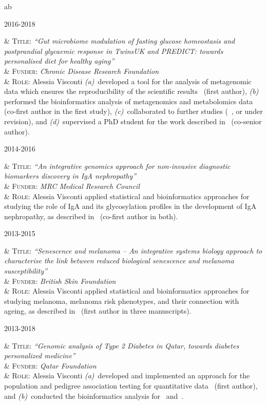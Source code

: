 \documentclass[a4paper,10pt]{article}
\newenvironment{singletablelist}
{	\vspace{-0.2cm}
	\begin{longtable}[!h]{ab}}{\end{longtable}
}
\newcommand{\stlist}[2]{
	\hspace{-3cm}
	\noindent
	\begin{minipage}{0.24\textwidth}
	\begin{flushright}
	\textsc{#1}
	\end{flushright}
	\end{minipage}
	& #2\\[0.2cm]
}
\begin{document}
\begin{singletablelist}
	
	\stlist{2016-2018}{ 
		\textsc{Title:} \emph{``Gut microbiome modulation of fasting glucose homeostasis and postprandial glycaemic response in TwinsUK and PREDICT: towards personalised diet for healthy aging''}\\
		& \textsc{Funder:} \emph{Chronic Disease Research Foundation}\\
		& \textsc{Role:} Alessia Visconti \emph{(a)}~developed a tool for the analysis of metagenomic data which ensures the reproducibility of the scientific results~\cite{Vis18b} (first author), \emph{(b)} performed the bioinformatics analysis of metagenomics and metabolomics data~\cite{Vis19,Bar20} (co-first author in the first study), \emph{(c)}~collaborated to further studies (~\cite{Lou23,Nog23a,Nog23b}, or under revision), and \emph{(d)}~supervised a PhD student for the work described in~\cite{Zha22} (co-senior author).
}

	\stlist{2014-2016}{  
		\textsc{Title:} \emph{``An integrative genomics approach for non-invasive diagnostic biomarkers discovery in IgA nephropathy''}\\
		& \textsc{Funder:} \emph{MRC Medical Research Council}\\
		& \textsc{Role:} Alessia Visconti applied statistical and bioinformatics approaches for studying the role of IgA and its glycosylation profiles in the development of IgA nephropathy, as described in~\cite{Lom16,Dot21} (co-first author in both).}
	
	\stlist{2013-2015}{ 
		\textsc{Title:} \emph{``Senescence and melanoma -- An integrative systems biology approach to characterise the link between reduced biological senescence and melanoma susceptibility''}\\
		& \textsc{Funder:} \emph{British Skin Foundation}\\
		& \textsc{Role:} Alessia Visconti applied statistical and bioinformatics approaches for studying melanoma, melanoma risk phenotypes, and their connection with ageing, as described in~\cite{Rib16,Hys18,Vis18a,Duf17,Vis19a,Vis20,San20} (first author in three manuscripts).}
				
	\stlist{2013-2018}{ 
		\textsc{Title:} \emph{``Genomic analysis of Type 2 Diabetes in Qatar, towards diabetes personalized medicine''}\\
		& \textsc{Funder:} \emph{Qatar Foundation}\\
		& \textsc{Role:} Alessia Visconti \emph{(a)}~developed and implemented an approach for the population and pedigree association testing for quantitative data~\cite{Vis16} (first author), and \emph{(b)}~conducted the bioinformatics analysis for~\cite{AlM15} and~\cite{Zag18}.}
	

\end{singletablelist}
\end{document}
